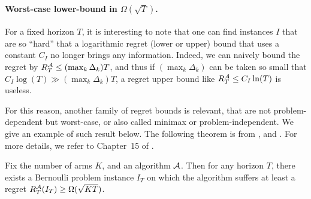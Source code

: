 \paragraph{Worst-case lower-bound in $\Omega(\sqrt{T})$.}
%
For a fixed horizon $T$, it is interesting to note that one can find instances $I$ that are so ``hard'' that a logarithmic regret (lower or upper) bound that uses a constant $C_I$ no longer brings any information.
Indeed, we can naively bound the regret by $R_T^{\mathcal{A}} \leq (\max_k \Delta_k) T$, and thus if $(\max_k \Delta_k)$ can be taken so small that $C_I \log(T) \gg (\max_k \Delta_k) T$, a regret upper bound like $R_T^{\mathcal{A}} \leq C_I \ln(T)$ is useless.
%

For this reason, another family of regret bounds is relevant, that are not problem-dependent but worst-case, or also called minimax \cite{Audibert2009minimax,audibert2010minimax} or problem-independent.
We give an example of such result below.
The following theorem is from \cite{Auer02NonStochastic}, and \cite[Theorem~2.1]{Slivkins2019}.
%
For more details, we refer to Chapter~15 of \cite{LattimoreBanditAlgorithmsBook}.

\begin{theorem}\label{thm:2:worstCaseLowerBound}
\begin{leftbar}[theorembar]  %
    Fix the number of arms $K$, and an algorithm $\mathcal{A}$.
    Then for any horizon $T$, there exists a Bernoulli problem instance $I_T$ on which the algorithm suffers at least a regret $R_T^{\mathcal{A}}(I_T) \geq \Omega(\sqrt{K T})$.
\end{leftbar}  %
\end{theorem}

